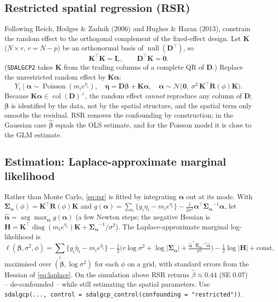 \documentclass[11pt]{article}
\newcommand{\R}{\mathbf{R}}
\newcommand{\D}{\mathbf{D}}
\newcommand{\K}{\mathbf{K}}
\newcommand{\I}{\mathbf{I}}
\newcommand{\bet}{{\bm{\beta}}}
\newcommand{\al}{{\bm{\alpha}}}
\newcommand{\Sal}{{\bm{\Sigma}_{\bm{\alpha}}}}
\newcommand{\N}{\mathcal{N}}
\begin{document}
\subsection{Restricted spatial regression (RSR)}
Following Reich, Hodges \& Zadnik (2006) and Hughes \& Haran (2013), constrain the
random effect to the orthogonal complement of the fixed-effect design. Let $\K$
($N\times r$, $r=N-p$) be an orthonormal basis of $\operatorname{null}(\D^\top)$, so
\begin{equation}
\K^\top\K=\I_r,\qquad \D^\top\K=\mathbf 0 .
\end{equation}
(\texttt{SDALGCP2} takes $\K$ from the trailing columns of a complete QR of $\D$.)
Replace the unrestricted random effect by $\K\al$:
\begin{equation}
\boxed{\;
Y_i\mid\al\sim\operatorname{Poisson}(m_i e^{\eta_i}),\quad
\bm\eta=\D\bet+\K\al,\quad
\al\sim\N\!\big(\mathbf 0,\ \sigma^2\,\K^\top\R(\phi)\K\big).\;}
\label{eq:rsr}
\end{equation}
Because $\K\al\in\operatorname{col}(\D)^\perp$, the random effect \emph{cannot}
reproduce any column of $\D$; $\bet$ is identified by the data, not by the spatial
structure, and the spatial term only smooths the residual. RSR removes the
confounding by construction; in the Gaussian case $\widehat\bet$ equals the OLS
estimate, and for the Poisson model it is close to the GLM estimate.

\subsection{Estimation: Laplace-approximate marginal likelihood}
Rather than Monte Carlo, \eqref{eq:rsr} is fitted by integrating $\al$ out at its
mode. With $\Sal(\phi)=\K^\top\R(\phi)\K$ and
$g(\al)=\sum_i\{y_i\eta_i-m_i e^{\eta_i}\}-\tfrac1{2\sigma^2}\al^\top\Sal^{-1}\al$,
let $\widehat\al=\arg\max_\al g(\al)$ (a few Newton steps; the negative Hessian is
$\mathbf H=\K^\top\operatorname{diag}(m_i e^{\eta_i})\K+\Sal^{-1}/\sigma^2$).
The Laplace-approximate marginal log-likelihood is
\begin{equation}
\ell(\bet,\sigma^2,\phi)=
\sum_i\{y_i\widehat\eta_i-m_i e^{\widehat\eta_i}\}
-\tfrac12\Big(r\log\sigma^2+\log|\Sal|
+\tfrac{\widehat\al^\top\Sal^{-1}\widehat\al}{\sigma^2}\Big)
-\tfrac12\log|\mathbf H| + \text{const},
\label{eq:laplace}
\end{equation}
maximised over $(\bet,\log\sigma^2)$ for each $\phi$ on a grid, with standard errors
from the Hessian of \eqref{eq:laplace}. On the simulation above RSR returns
$\widehat\beta\approx0.44$ (SE $0.07$) -- de-confounded -- while still estimating the
spatial parameters. Use \texttt{sdalgcp(..., control = sdalgcp\_control(confounding
= "restricted"))}.
\end{document}
